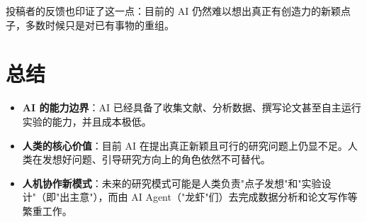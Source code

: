 \documentclass[12pt,a4paper]{article}
\begin{document}
投稿者的反馈也印证了这一点：目前的 AI 仍然难以想出真正有创造力的新颖点子，多数时候只是对已有事物的重组。

\section{总结}

\begin{itemize}[leftmargin=2em]
  \item \textbf{AI 的能力边界}：AI 已经具备了收集文献、分析数据、撰写论文甚至自主运行实验的能力，并且成本极低。
  \item \textbf{人类的核心价值}：目前 AI 在提出真正新颖且可行的研究问题上仍显不足。人类在发想好问题、引导研究方向上的角色依然不可替代。
  \item \textbf{人机协作新模式}：未来的研究模式可能是人类负责"点子发想"和"实验设计"（即"出主意"），而由 AI Agent（"龙虾"们）去完成数据分析和论文写作等繁重工作。
\end{itemize}
\end{document}
